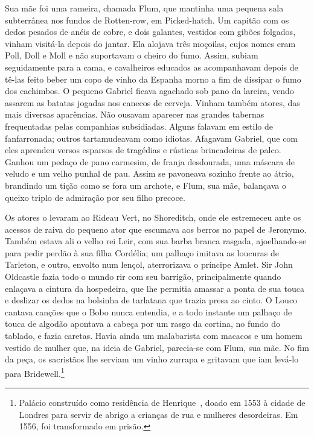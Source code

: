Sua mãe foi uma rameira, chamada Flum, que mantinha uma pequena sala
subterrânea nos fundos de Rotten-row, em Picked-hatch. Um capitão com os
dedos pesados de anéis de cobre, e dois galantes, vestidos com gibões
folgados, vinham visitá-la depois do jantar. Ela alojava três moçoilas,
cujos nomes eram Poll, Doll e Moll e não suportavam o cheiro do fumo.
Assim, subiam seguidamente para a cama, e cavalheiros educados as
acompanhavam depois de tê-las feito beber um copo de vinho da Espanha
morno a fim de dissipar o fumo dos cachimbos. O pequeno Gabriel ficava
agachado sob pano da lareira, vendo assarem as batatas jogadas nos canecos
de cerveja. Vinham também atores, das mais diversas aparências. Não
ousavam aparecer nas grandes tabernas frequentadas pelas companhias
subsidiadas. Alguns falavam em estilo de fanfarronada; outros
tartamudeavam como idiotas. Afagavam Gabriel, que com eles aprendeu versos
esparsos de tragédias e rústicas brincadeiras de palco. Ganhou um pedaço
de pano carmesim, de franja desdourada, uma máscara de veludo e um velho
punhal de pau. Assim se pavoneava sozinho frente ao átrio, brandindo um
tição como se fora um archote, e Flum, sua mãe, balançava o queixo triplo
de admiração por seu filho precoce.

Os atores o levaram ao Rideau Vert, no Shoreditch, onde ele estremeceu ante
os acessos de raiva do pequeno ator que escumava aos berros no papel de
Jeronymo. Também estava ali o velho rei Leir, com sua barba branca
rasgada, ajoelhando-se para pedir perdão à sua filha Cordélia; um palhaço
imitava as loucuras de Tarleton, e outro, envolto num lençol, aterrorizava
o príncipe Amlet. Sir John Oldcastle fazia todo o mundo rir com seu
barrigão, principalmente quando enlaçava a cintura da hospedeira, que lhe
permitia amassar a ponta de sua touca e deslizar os dedos na bolsinha de
tarlatana que trazia presa ao cinto. O Louco cantava canções que o Bobo
nunca entendia, e a todo instante um palhaço de touca de algodão apontava
a cabeça por um rasgo da cortina, no fundo do tablado, e fazia caretas.
Havia ainda um malabarista com macacos e um homem vestido de mulher que,
na ideia de Gabriel, parecia-se com Flum, sua mãe. No fim da peça, os
sacristãos lhe serviam um vinho zurrapa e gritavam que iam levá-lo para
Bridewell.\footnote{ Palácio construído como residência de Henrique~, 
doado em 1553 à cidade de Londres para servir de abrigo a crianças de
rua e mulheres desordeiras. Em 1556, foi transformado em prisão.}

